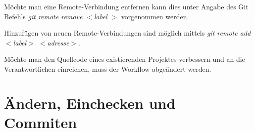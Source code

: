 Möchte man eine Remote-Verbindung entfernen kann dies unter Angabe des Git Befehls \textit{git remote remove  $ < $label $ > $} vorgenommen werden. 
  
Hinzufügen von neuen Remote-Verbindungen sind möglich mittels \textit{git remote add $ < $label$ > $ $ < $adresse$ > $}.

\begin{INFO}
  Möchte man den Quellcode eines existierenden Projektes verbessern und an die Verantwortlichen einreichen, muss der Workflow abgeändert werden.
  
  
\end{INFO}


\section{Ändern, Einchecken und Commiten}

